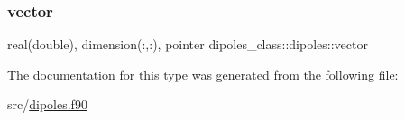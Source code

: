 \mbox{\label{structdipoles__class_1_1dipoles_a658a483ea027a653fefdd02718773ea6}} 
\subsubsection{\texorpdfstring{vector}{vector}}
{\footnotesize\ttfamily real(double), dimension(\+:,\+:), pointer dipoles\+\_\+class\+::dipoles\+::vector\hspace{0.3cm}{\ttfamily [private]}}



The documentation for this type was generated from the following file\+:\begin{DoxyCompactItemize}
\item 
src/\hyperlink{dipoles_8f90}{dipoles.\+f90}\end{DoxyCompactItemize}

